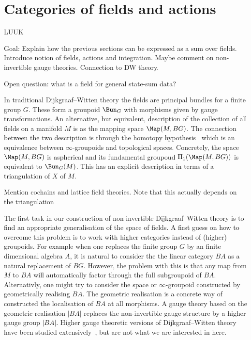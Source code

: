 
\section{Categories of fields and actions}

LUUK

Goal: Explain how the previous sections can be expressed as a sum over fields. Introduce notion of fields, actions and integration. Maybe comment on non-invertible gauge theories. Connection to DW theory.

Open question: what is a field for general state-sum data?

In traditional Dijkgraaf--Witten theory the fields are principal bundles for a finite
group $G$. These form a groupoid $\Bun_G$ with morphisms given by gauge
transformations. An alternative, but equivalent, description of the collection of all fields on a manifold $M$ is as the mapping space $\Map(M,BG)$. The connection
between the two description is through the homotopy hypothesis~\cite{} which is
an equivalence between $\infty$-groupoids and topological spaces. Concretely,
the space $\Map(M,BG)$ is aspherical and its fundamental groupoud $\Pi_1
(\Map(M,BG))$ is equivalent to $\Bun_G(M)$.
This has an explicit description in terms of a triangulation of $X$ of $M$.

\color{red} Mention cochains and lattice field theories. Note that this actually
depends on the triangulation \color{black}

The first task in our construction of non-invertible Dijkgraaf--Witten theory
is to find an appropriate generalisation of the space of fields. A first guess
on how to overcome this problem is to work with higher categories instead of
(higher) groupoids. For example when one replaces the finite group $G$ by an
finite dimensional algebra $A$, it is natural to consider the the linear category
$BA$ as a natural replacement of $BG$. However, the problem with this is
that any map from $M$ to $BA$ will automatically factor through the full
subgroupoid of $BA$. Alternativly, one might try to consider the space or
$\infty$-groupoid constructed by geometrically realising $BA$. The geometric
realisation is a concrete way of constructed the localisation of $BA$ at all
morphisms. A gauge theory based on the geometric realisation $|BA|$ replaces the
non-invertible gauge structure by a higher gauge group $|BA|$. Higher gauge
theoretic versions of Dijkgraaf--Witten theory have been studied
extensively~\cite{some thing}, but are not what we are interested in here.

